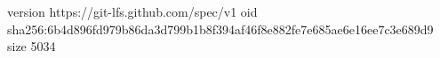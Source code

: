 version https://git-lfs.github.com/spec/v1
oid sha256:6b4d896fd979b86da3d799b1b8f394af46f8e882fe7e685ae6e16ee7c3e689d9
size 5034
